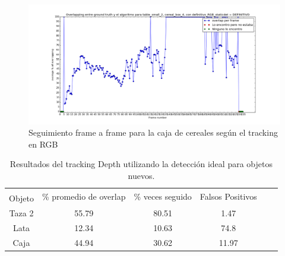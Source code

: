 \begin{figure}
	\centering
	\includegraphics[width=\textwidth]{img/seguimientoframeaframe-rgb-nuevo-caja.png}
	\caption{Seguimiento frame a frame para la caja de cereales según el tracking en RGB}
	\label{frame_frame_rgb_nuevo}
\end{figure}



\begin{table}[h]
    \begin{tabular}{|c|c|c|c|c|c|}
    \hline
    & \multirow{2}{2.4cm}{\% promedio de overlap} & \multirow{2}{2cm}{\% veces seguido} & \multirow{2}{1.6cm}{Falsos Positivos}\\
	Objeto & & &\\
    \hline
    Taza 2  & 55.79      & 80.51             &  1.47 \\
    \hline
    Lata    & 12.34      & 10.63             &  74.8 \\
    \hline
    Caja    & 44.94      & 30.62             & 11.97 \\
    \hline
    \end{tabular}
\caption{Resultados del tracking Depth utilizando la detección ideal para objetos nuevos.}
\label{tabla_d_nuevos}
\end{table}

